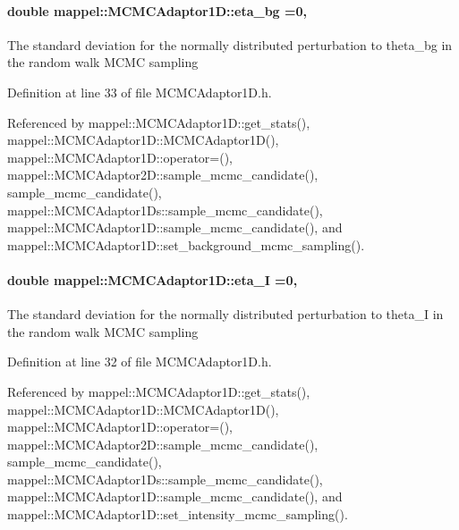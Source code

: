 \paragraph[{\texorpdfstring{eta\+\_\+bg}{eta_bg}}]{\setlength{\rightskip}{0pt plus 5cm}double mappel\+::\+M\+C\+M\+C\+Adaptor1\+D\+::eta\+\_\+bg =0\hspace{0.3cm}{\ttfamily [protected]}, {\ttfamily [inherited]}}\hypertarget{classmappel_1_1MCMCAdaptor1D_af54c93421b8e298289cbb92743c6b3d5}{}\label{classmappel_1_1MCMCAdaptor1D_af54c93421b8e298289cbb92743c6b3d5}
The standard deviation for the normally distributed perturbation to theta\+\_\+bg in the random walk M\+C\+MC sampling 

Definition at line 33 of file M\+C\+M\+C\+Adaptor1\+D.\+h.



Referenced by mappel\+::\+M\+C\+M\+C\+Adaptor1\+D\+::get\+\_\+stats(), mappel\+::\+M\+C\+M\+C\+Adaptor1\+D\+::\+M\+C\+M\+C\+Adaptor1\+D(), mappel\+::\+M\+C\+M\+C\+Adaptor1\+D\+::operator=(), mappel\+::\+M\+C\+M\+C\+Adaptor2\+D\+::sample\+\_\+mcmc\+\_\+candidate(), sample\+\_\+mcmc\+\_\+candidate(), mappel\+::\+M\+C\+M\+C\+Adaptor1\+Ds\+::sample\+\_\+mcmc\+\_\+candidate(), mappel\+::\+M\+C\+M\+C\+Adaptor1\+D\+::sample\+\_\+mcmc\+\_\+candidate(), and mappel\+::\+M\+C\+M\+C\+Adaptor1\+D\+::set\+\_\+background\+\_\+mcmc\+\_\+sampling().

\paragraph[{\texorpdfstring{eta\+\_\+I}{eta_I}}]{\setlength{\rightskip}{0pt plus 5cm}double mappel\+::\+M\+C\+M\+C\+Adaptor1\+D\+::eta\+\_\+I =0\hspace{0.3cm}{\ttfamily [protected]}, {\ttfamily [inherited]}}\hypertarget{classmappel_1_1MCMCAdaptor1D_a5780d326be0c40e10d6c91777cfffbd3}{}\label{classmappel_1_1MCMCAdaptor1D_a5780d326be0c40e10d6c91777cfffbd3}
The standard deviation for the normally distributed perturbation to theta\+\_\+I in the random walk M\+C\+MC sampling 

Definition at line 32 of file M\+C\+M\+C\+Adaptor1\+D.\+h.



Referenced by mappel\+::\+M\+C\+M\+C\+Adaptor1\+D\+::get\+\_\+stats(), mappel\+::\+M\+C\+M\+C\+Adaptor1\+D\+::\+M\+C\+M\+C\+Adaptor1\+D(), mappel\+::\+M\+C\+M\+C\+Adaptor1\+D\+::operator=(), mappel\+::\+M\+C\+M\+C\+Adaptor2\+D\+::sample\+\_\+mcmc\+\_\+candidate(), sample\+\_\+mcmc\+\_\+candidate(), mappel\+::\+M\+C\+M\+C\+Adaptor1\+Ds\+::sample\+\_\+mcmc\+\_\+candidate(), mappel\+::\+M\+C\+M\+C\+Adaptor1\+D\+::sample\+\_\+mcmc\+\_\+candidate(), and mappel\+::\+M\+C\+M\+C\+Adaptor1\+D\+::set\+\_\+intensity\+\_\+mcmc\+\_\+sampling().

